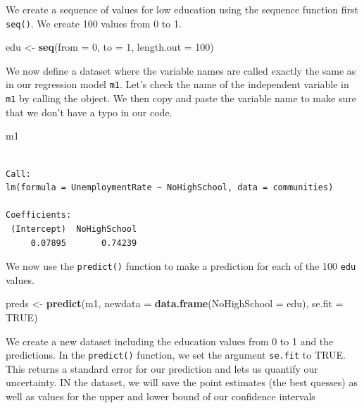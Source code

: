 \documentclass[]{article}
\newenvironment{Shaded}{\begin{snugshade}}{\end{snugshade}}
\newcommand{\DataTypeTok}[1]{\textcolor[rgb]{0.13,0.29,0.53}{#1}}
\newcommand{\DecValTok}[1]{\textcolor[rgb]{0.00,0.00,0.81}{#1}}
\newcommand{\KeywordTok}[1]{\textcolor[rgb]{0.13,0.29,0.53}{\textbf{#1}}}
\newcommand{\NormalTok}[1]{#1}
\newcommand{\OtherTok}[1]{\textcolor[rgb]{0.56,0.35,0.01}{#1}}
\newcommand{\StringTok}[1]{\textcolor[rgb]{0.31,0.60,0.02}{#1}}
\begin{document}
We create a sequence of values for low education using the sequence function first \texttt{seq()}. We create 100 values from 0 to 1.

\begin{Shaded}
\begin{Highlighting}[]
\NormalTok{edu <-}\StringTok{ }\KeywordTok{seq}\NormalTok{(}\DataTypeTok{from =} \DecValTok{0}\NormalTok{, }\DataTypeTok{to =} \DecValTok{1}\NormalTok{, }\DataTypeTok{length.out =} \DecValTok{100}\NormalTok{)}
\end{Highlighting}
\end{Shaded}

We now define a dataset where the variable names are called exactly the same as in our regression model \texttt{m1}. Let's check the name of the independent variable in \texttt{m1} by calling the object. We then copy and paste the variable name to make sure that we don't have a typo in our code.

\begin{Shaded}
\begin{Highlighting}[]
\NormalTok{m1}
\end{Highlighting}
\end{Shaded}

\begin{verbatim}

Call:
lm(formula = UnemploymentRate ~ NoHighSchool, data = communities)

Coefficients:
 (Intercept)  NoHighSchool  
     0.07895       0.74239  
\end{verbatim}

We now use the \texttt{predict()} function to make a prediction for each of the 100 \texttt{edu} values.

\begin{Shaded}
\begin{Highlighting}[]
\NormalTok{preds <-}\StringTok{ }\KeywordTok{predict}\NormalTok{(m1, }\DataTypeTok{newdata =} \KeywordTok{data.frame}\NormalTok{(}\DataTypeTok{NoHighSchool =}\NormalTok{ edu), }\DataTypeTok{se.fit =} \OtherTok{TRUE}\NormalTok{)}
\end{Highlighting}
\end{Shaded}

We create a new dataset including the education values from 0 to 1 and the predictions. In the \texttt{predict()} function, we set the argument \texttt{se.fit} to TRUE. This returns a standard error for our prediction and lets us quantify our uncertainty. IN the dataset, we will save the point estimates (the best quesses) as well as values for the upper and lower bound of our confidence intervals
\end{document}
